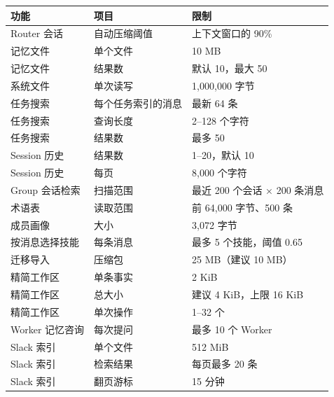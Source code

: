 \documentclass[UTF8,a4paper,11pt]{ctexart}
\begin{document}
\begin{longtable}{P{4.6cm}P{5.4cm}P{3.8cm}}
\toprule
功能 & 项目 & 限制 \\
\midrule
\endhead
Router 会话 & 自动压缩阈值 & 上下文窗口的 90\% \\
记忆文件 & 单个文件 & 10 MB \\
记忆文件 &  结果数 & 默认 10，最大 50 \\
系统文件 & 单次读写 & 1,000,000 字节 \\
任务搜索 & 每个任务索引的消息 & 最新 64 条 \\
任务搜索 & 查询长度 & 2--128 个字符 \\
任务搜索 & 结果数 & 最多 50 \\
Session 历史 &  结果数 & 1--20，默认 10 \\
Session 历史 &  每页 & 8,000 个字符 \\
Group 会话检索 & 扫描范围 & 最近 200 个会话 × 200 条消息 \\
术语表 & 读取范围 & 前 64,000 字节、500 条 \\
成员画像 & 大小 & 3,072 字节 \\
按消息选择技能 & 每条消息 & 最多 5 个技能，阈值 0.65 \\
迁移导入 & 压缩包 & 25 MB（建议 10 MB） \\
精简工作区 & 单条事实 & 2 KiB \\
精简工作区 & 总大小 & 建议 4 KiB，上限 16 KiB \\
精简工作区 & 单次操作 & 1--32 个 \\
Worker 记忆咨询 & 每次提问 & 最多 10 个 Worker \\
Slack 索引 & 单个文件 & 512 MiB \\
Slack 索引 & 检索结果 & 每页最多 20 条 \\
Slack 索引 & 翻页游标 & 15 分钟 \\
\bottomrule
\end{longtable}
\end{document}
